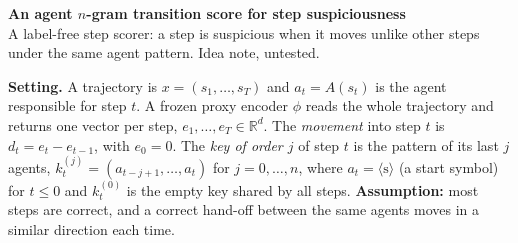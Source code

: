 \documentclass[10pt,a4paper]{article}
\newcommand{\bos}{\langle\mathrm{s}\rangle}
\begin{document}
{\Large\bfseries\color{secblue} An agent $n$-gram transition score for step suspiciousness}\\[1pt]
{\small\textcolor{ourfr}{A label-free step scorer: a step is suspicious when it moves unlike other steps under the same agent pattern. Idea note, untested.}}

\vspace{2pt}
\textbf{Setting.} A trajectory is $x=(s_1,\dots,s_T)$ and $a_t=A(s_t)$ is the agent responsible for step $t$. A frozen proxy encoder $\phi$ reads the whole trajectory and returns one vector per step, $e_1,\dots,e_T\in\mathbb{R}^d$. The \emph{movement} into step $t$ is $d_t=e_t-e_{t-1}$, with $e_0=0$. The \emph{key of order $j$} of step $t$ is the pattern of its last $j$ agents, $k_t^{(j)}=(a_{t-j+1},\dots,a_t)$ for $j=0,\dots,n$, where $a_t=\bos$ (a start symbol) for $t\le0$ and $k_t^{(0)}$ is the empty key shared by all steps. \textbf{Assumption:} most steps are correct, and a correct hand-off between the same agents moves in a similar direction each time.
\end{document}
